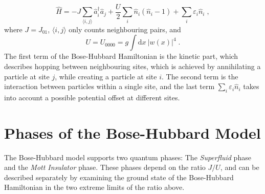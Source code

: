 \begin{equation}
	\hat{H} = - J \sum_{\langle i,j \rangle} \hat{a}_{i}^{\dag} \hat{a}_{j} + \frac{U}{2} \sum_{i} \hat{n}_i \left( \hat{n}_i -1 \right) + \sum_{i} \varepsilon_i \hat{n}_i \; ,
	\label{BHhamil}
\end{equation}
where $J = J_{0 1}$, $\langle i,j \rangle$ only counts neighbouring pairs, and
\begin{equation}
	U = U_{0 0 0 0} = g \int \mathrm{d}x \ |w(x)|^4 \; .
\end{equation}
The first term of the Bose-Hubbard Hamiltonian is the kinetic part, which describes hopping between neighbouring sites, which is achieved by annihilating a particle at site $j$, while creating a particle at site $i$. The second term is the interaction between particles within a single site, and the last term $\sum_{i} \varepsilon_i \hat{n}_i$ takes into account a possible potential offset at different sites.


\section{Phases of the Bose-Hubbard Model}

The Bose-Hubbard model supports two quantum phases: The \textit{Superfluid} phase and the \textit{Mott Insulator} phase. These phases depend on the ratio $J/U$, and can be described separately by examining the ground state of the Bose-Hubbard Hamiltonian in the two extreme limits of the ratio above.


